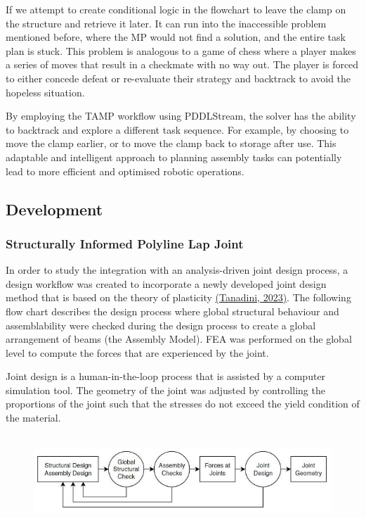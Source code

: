 \documentclass[11pt]{book}
\begin{document}
If we attempt to create conditional logic in the flowchart to leave the clamp on the structure and retrieve it later. It can run into the inaccessible problem mentioned before, where the MP would not find a solution, and the entire task plan is stuck. This problem is analogous to a game of chess where a player makes a series of moves that result in a checkmate with no way out. The player is forced to either concede defeat or re-evaluate their strategy and backtrack to avoid the hopeless situation.

By employing the TAMP workflow using PDDLStream, the solver has the ability to backtrack and explore a different task sequence. For example, by choosing to move the clamp earlier, or to move the clamp back to storage after use. This adaptable and intelligent approach to planning assembly tasks can potentially lead to more efficient and optimised robotic operations.

\subsection{Development}

\subsubsection{Structurally Informed Polyline Lap Joint}

In order to study the integration with an analysis-driven joint design process, a design workflow was created to incorporate a newly developed joint design method that is based on the theory of plasticity \href{https://www.zotero.org/google-docs/?KG0grc}{(Tanadini, 2023)}. The following flow chart describes the design process where global structural behaviour and assemblability were checked during the design process to create a global arrangement of beams (the Assembly Model). FEA was performed on the global level to compute the forces that are experienced by the joint. 

Joint design is a human-in-the-loop process that is assisted by a computer simulation tool. The geometry of the joint was adjusted by controlling the proportions of the joint such that the stresses do not exceed the yield condition of the material.

\begin{figure}[H]
\includegraphics[width=15.92cm,height=3.42cm]{./images/image3.jpeg}
\end{figure}
\end{document}
